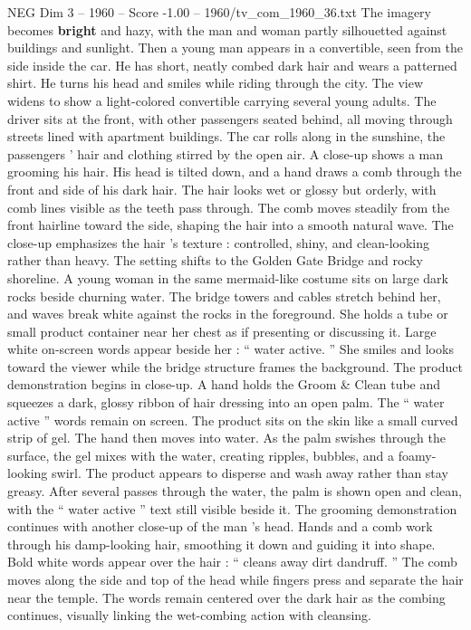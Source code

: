 \begin{textsample}{NEG Dim 3 – 1960 – Score -1.00 – 1960/tv\_com\_1960\_36.txt}
The imagery becomes \textbf{bright} and hazy, with the man and woman partly silhouetted against buildings and sunlight.
Then a young man appears in a convertible, seen from the side inside the car.
He has short, neatly combed dark hair and wears a patterned shirt.
He turns his head and smiles while riding through the city.
The view widens to show a light-colored convertible carrying several young adults.
The driver sits at the front, with other passengers seated behind, all moving through streets lined with apartment buildings.
The car rolls along in the sunshine, the passengers ’ hair and clothing stirred by the open air.
A close-up shows a man grooming his hair.
His head is tilted down, and a hand draws a comb through the front and side of his dark hair.
The hair looks wet or glossy but orderly, with comb lines visible as the teeth pass through.
The comb moves steadily from the front hairline toward the side, shaping the hair into a smooth natural wave.
The close-up emphasizes the hair ’s texture : controlled, shiny, and clean-looking rather than heavy.
The setting shifts to the Golden Gate Bridge and rocky shoreline.
A young woman in the same mermaid-like costume sits on large dark rocks beside churning water.
The bridge towers and cables stretch behind her, and waves break white against the rocks in the foreground.
She holds a tube or small product container near her chest as if presenting or discussing it.
Large white on-screen words appear beside her : “ water active. ” She smiles and looks toward the viewer while the bridge structure frames the background.
The product demonstration begins in close-up.
A hand holds the Groom \& Clean tube and squeezes a dark, glossy ribbon of hair dressing into an open palm.
The “ water active ” words remain on screen.
The product sits on the skin like a small curved strip of gel.
The hand then moves into water.
As the palm swishes through the surface, the gel mixes with the water, creating ripples, bubbles, and a foamy-looking swirl.
The product appears to disperse and wash away rather than stay greasy.
After several passes through the water, the palm is shown open and clean, with the “ water active ” text still visible beside it.
The grooming demonstration continues with another close-up of the man ’s head.
Hands and a comb work through his damp-looking hair, smoothing it down and guiding it into shape.
Bold white words appear over the hair : “ cleans away dirt dandruff. ” The comb moves along the side and top of the head while fingers press and separate the hair near the temple.
The words remain centered over the dark hair as the combing continues, visually linking the wet-combing action with cleansing.

\end{textsample}
